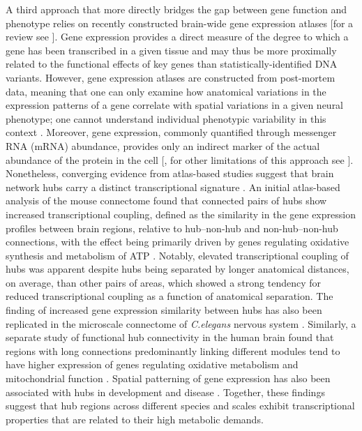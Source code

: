 A third approach that more directly bridges the gap between gene function and phenotype relies on recently constructed brain-wide gene expression atlases \citep{Hawrylycz2012} [for a review see \citep{Keil2018}]. Gene expression provides a direct measure of the degree to which a gene has been transcribed in a given tissue and may thus be more proximally related to the functional effects of key genes than statistically-identified DNA variants. However, gene expression atlases are constructed from post-mortem data, meaning that one can only examine how anatomical variations in the expression patterns of a gene correlate with spatial variations in a given neural phenotype; one cannot understand individual phenotypic variability in this context \citep{Fornito2019}. Moreover, gene expression, commonly quantified through messenger RNA (mRNA) abundance, provides only an indirect marker of the actual abundance of the protein in the cell [\citep{Futcher1999,Greenbaum2003,Gygi1999}, for other limitations of this approach see \citep{Fornito2019}]. Nonetheless, converging evidence from atlas-based studies suggest that brain network hubs carry a distinct transcriptional signature \citep{Arnatkeviciute2018,Fulcher2016,Rubinov2015c,Vertes2016b}. An initial atlas-based analysis of the mouse connectome found that connected pairs of hubs show increased transcriptional coupling, defined as the similarity in the gene expression profiles between brain regions, relative to hub--non-hub and non-hub--non-hub connections, with the effect being primarily driven by genes regulating oxidative synthesis and metabolism of ATP \citep{Fulcher2016}. Notably, elevated transcriptional coupling of hubs was apparent despite hubs being separated by longer anatomical distances, on average, than other pairs of areas, which showed a strong tendency for reduced transcriptional coupling as a function of anatomical separation. The finding of increased gene expression similarity between hubs has also been replicated in the microscale connectome of \textit{C.elegans} nervous system \citep{Arnatkeviciute2018}. Similarly, a separate study of functional hub connectivity in the human brain found that regions with long connections predominantly linking different modules tend to have higher expression of genes regulating oxidative metabolism and mitochondrial function \citep{Vertes2016b}. Spatial patterning of gene expression has also been associated with hubs in development \citep{Whitaker2016a} and disease \citep{Rittman2016}. Together, these findings suggest that hub regions across different species and scales exhibit transcriptional properties that are related to their high metabolic demands.

